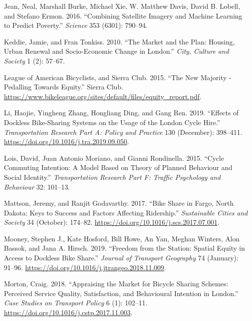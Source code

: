 \documentclass[
]{article}
\newlength{\cslhangindent}
\newenvironment{cslreferences}%
  {\setlength{\parindent}{0pt}%
  \everypar{\setlength{\hangindent}{\cslhangindent}}\ignorespaces}%
  {\par}
\begin{document}
\begin{cslreferences}
\leavevmode\hypertarget{ref-jean_combining_2016}{}%
Jean, Neal, Marshall Burke, Michael Xie, W. Matthew Davis, David B. Lobell, and Stefano Ermon. 2016. ``Combining Satellite Imagery and Machine Learning to Predict Poverty.'' \emph{Science} 353 (6301): 790--94.

\leavevmode\hypertarget{ref-keddie_market_2010}{}%
Keddie, Jamie, and Fran Tonkiss. 2010. ``The Market and the Plan: Housing, Urban Renewal and Socio-Economic Change in London.'' \emph{City, Culture and Society} 1 (2): 57--67.

\leavevmode\hypertarget{ref-league_of_american_bicyclists_new_2015}{}%
League of American Bicyclists, and Sierra Club. 2015. ``The New Majority - Pedalling Towards Equity.'' Sierra Club. \url{https://www.bikeleague.org/sites/default/files/equity_report.pdf}.

\leavevmode\hypertarget{ref-li_effects_2019}{}%
Li, Haojie, Yingheng Zhang, Hongliang Ding, and Gang Ren. 2019. ``Effects of Dockless Bike-Sharing Systems on the Usage of the London Cycle Hire.'' \emph{Transportation Research Part A: Policy and Practice} 130 (December): 398--411. \url{https://doi.org/10.1016/j.tra.2019.09.050}.

\leavevmode\hypertarget{ref-lois_cycle_2015}{}%
Lois, David, Juan Antonio Moriano, and Gianni Rondinella. 2015. ``Cycle Commuting Intention: A Model Based on Theory of Planned Behaviour and Social Identity.'' \emph{Transportation Research Part F: Traffic Psychology and Behaviour} 32: 101--13.

\leavevmode\hypertarget{ref-mattson_bike_2017}{}%
Mattson, Jeremy, and Ranjit Godavarthy. 2017. ``Bike Share in Fargo, North Dakota: Keys to Success and Factors Affecting Ridership.'' \emph{Sustainable Cities and Society} 34 (October): 174--82. \url{https://doi.org/10.1016/j.scs.2017.07.001}.

\leavevmode\hypertarget{ref-mooney_freedom_2019}{}%
Mooney, Stephen J., Kate Hosford, Bill Howe, An Yan, Meghan Winters, Alon Bassok, and Jana A. Hirsch. 2019. ``Freedom from the Station: Spatial Equity in Access to Dockless Bike Share.'' \emph{Journal of Transport Geography} 74 (January): 91--96. \url{https://doi.org/10.1016/j.jtrangeo.2018.11.009}.

\leavevmode\hypertarget{ref-morton_appraising_2018}{}%
Morton, Craig. 2018. ``Appraising the Market for Bicycle Sharing Schemes: Perceived Service Quality, Satisfaction, and Behavioural Intention in London.'' \emph{Case Studies on Transport Policy} 6 (1): 102--11. \url{https://doi.org/10.1016/j.cstp.2017.11.003}.


\end{cslreferences}
\end{document}
